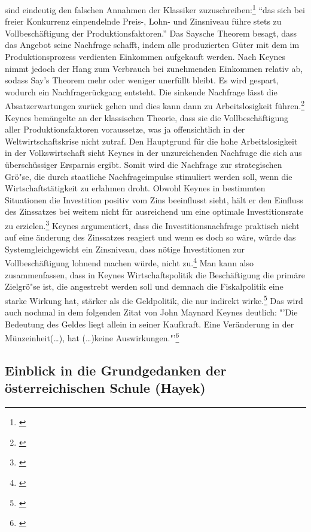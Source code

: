 \documentclass[
        onecolumn,
        a4paper,
        abstracton,
        parskip=half
        ,final
        ]{scrartcl}
\begin{document}
sind eindeutig den falschen Annahmen der Klassiker zuzuschreiben:\footnote[603]{\citep*[S.36]{Keynes2011}} "`das sich bei freier Konkurrenz einpendelnde Preis-, Lohn- und Zinsniveau f{\"u}hre stets zu Vollbesch{\"a}ftigung der Produktionsfaktoren."'
Das Saysche Theorem besagt, dass das Angebot seine Nachfrage schafft, indem alle produzierten G{\"u}ter mit dem im Produktionsprozess verdienten
Einkommen aufgekauft werden. Nach Keynes nimmt jedoch der Hang zum Verbrauch bei zunehmenden Einkommen relativ ab, sodass Say's Theorem mehr oder weniger unerf{\"u}llt bleibt. Es wird gespart, wodurch ein Nachfrager{\"u}ckgang entsteht. Die sinkende
Nachfrage l{\"a}sst die Absatzerwartungen zur{\"u}ck gehen und dies kann dann zu Arbeitslosigkeit f{\"u}hren.\footnote[604]{\citep*[S.203]{peters2000}} Keynes bem{\"a}ngelte an der klassischen Theorie, dass sie die Vollbesch{\"a}ftigung aller Produktionsfaktoren voraussetze, was ja offensichtlich in
der Weltwirtschaftskrise nicht zutraf. Den Hauptgrund f{\"u}r die hohe Arbeitslosigkeit in der Volkswirtschaft sieht Keynes in der unzureichenden Nachfrage die sich aus {\"u}bersch{\"u}ssiger Ersparnis ergibt. Somit wird die Nachfrage zur strategischen Gr{\"o}{"s}e,
die durch staatliche Nachfrageimpulse stimuliert werden soll, wenn die
Wirtschaftst{\"a}tigkeit zu erlahmen droht. Obwohl Keynes in bestimmten Situationen die
Investition positiv vom Zins beeinflusst sieht, h{\"a}lt er den Einfluss des Zinssatzes
bei weitem nicht f{\"u}r ausreichend um eine optimale Investitionsrate zu erzielen.\footnote[605]{\citep*[S.208]{peters2000}}
Keynes argumentiert, dass die Investitionsnachfrage praktisch nicht auf eine
{\"a}nderung des Zinssatzes reagiert und wenn es doch so w{\"a}re, w{\"u}rde das Systemgleichgewicht
ein Zinsniveau, dass n{\"o}tige Investitionen zur Vollbesch{\"a}ftigung lohnend machen w{\"u}rde,
nicht zu.\footnote[606]{ \citep*[S.174]{bombach1981theorie}}
Man kann also zusammenfassen, dass in Keynes Wirtschaftspolitik die Besch{\"a}ftigung
die prim{\"a}re Zielgr{\"o}{"s}e ist, die angestrebt werden soll und demnach die Fiskalpolitik
eine starke Wirkung hat, st{\"a}rker als die Geldpolitik, die nur indirekt wirke.\footnote[607]{ \citep*[S.181]{bombach1981theorie}}
Das wird auch nochmal in dem folgenden Zitat von John Maynard Keynes deutlich:
"'Die Bedeutung des Geldes liegt allein in seiner Kaufkraft. Eine Ver{\"a}nderung in der
M{\"u}nzeinheit(\ldots), hat (\ldots)keine Auswirkungen."'\footnote[608]{\citep*[S.1]{Keynes1997}}


\subsection{Einblick in die Grundgedanken der {\"o}sterreichischen Schule (Hayek)} %
\end{document}
